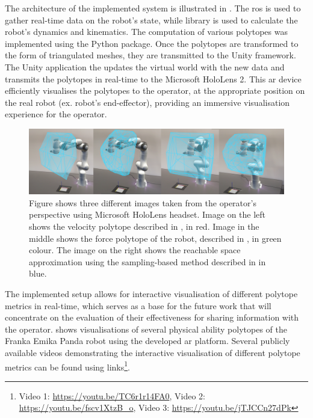 The architecture of the implemented system is illustrated in . The \gls{ros} is used to gather real-time data on the robot's state, while  \cite{pinocchio2021} library is used to calculate the robot's dynamics and kinematics. The computation of various polytopes was implemented using the  Python package. Once the polytopes are transformed to the form of triangulated meshes, they are transmitted to the Unity framework. The Unity application the updates the virtual world with the new data and transmits the polytopes in real-time to the Microsoft HoloLens 2. This \gls{ar} device efficiently visualises the polytopes to the operator, at the appropriate position on the real robot (ex. robot's end-effector), providing an immersive visualisation experience for the operator.

\begin{figure}[!h]
    \centering
    \includegraphics[width=\linewidth]{Papers/images/HoleLens3.jpg}
    \caption{Figure shows three different images taken from the operator's perspective using Microsoft HoloLens headset. Image on the left shows the velocity polytope described in , in red. Image in the middle shows the force polytope of the robot, described in , in green colour. The image on the right shows the reachable space approximation using the sampling-based method described in  in blue.}
    \label{fig:ar_images}
\end{figure}


The implemented setup allows for interactive visualisation of different polytope metrics in real-time, which serves as a base for the future work that will concentrate on the evaluation of their effectiveness for sharing information with the operator.  shows visualisations of several physical ability polytopes of the Franka Emika Panda robot using the developed \gls{ar} platform. Several publicly available videos demonstrating the interactive visualisation of different polytope metrics can be found using links\footnote{Video 1: \url{https://youtu.be/TC6r1r14FA0}, Video 2: \url{https://youtu.be/fscv1XtzB_o}, Video 3: \url{https://youtu.be/jTJCCn27dPk}}.


